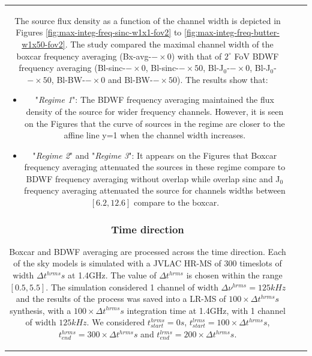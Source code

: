 \documentclass[useAMS,usenatbib]{mn2e}
\begin{document}
\begin{tabular}{*3{c}}
The source flux density as a function of the channel width is depicted in Figures \ref{fig:max-integ-freq-sinc-w1x1-fov2} to 
\ref{fig:max-integ-freq-butter-w1x50-fov2}. The study compared the maximal channel width of the boxcar frequency  averaging 
(Bx-avg-$-\times 0$) 
with that of  $2^{\circ}$ FoV BDWF frequency averaging (Bl-sinc-$-\times 0$, Bl-sinc-$-\times 50$, Bl-J$_0$-$-\times 0$, Bl-J$_0$-$-\times 
50$, Bl-BW-$-\times 0$ and Bl-BW-$-\times 50$). 
The results show that:
\begin{itemize}
 \item "\textit{Regime 1}":  The BDWF frequency averaging maintained the flux density of the source for wider frequency channels. However, 
it is seen on the Figures that the curve of sources in the regime are closer to the affine line y=1 when the channel width increases.
 \item  "\textit{Regime 2}" and "\textit{Regime 3}": It appears on the Figures that Boxcar frequency averaging attenuated the sources in 
these regime compare to BDWF frequency averaging without overlap while overlap sinc and J$_0$ frequency averaging attenuated the source for 
channels widths between $[6.2,12.6]$ compare to the boxcar. 
\end{itemize}
\subsubsection{Time direction}
Boxcar and BDWF averaging are processed across the time direction.
 Each of the sky models is simulated with a JVLAC HR-MS of $300$ timeslots of width $\Delta t^{hrms}s$ at 1.4GHz. The value of  
$\Delta t^{hrms}$ is chosen within the range $[0.5,5.5]$. The simulation considered  1 channel of width $\Delta \nu^{hrms}=125kHz$ and the 
results of the process was saved into a LR-MS of $100\times\Delta t^{hrms}s$ synthesis, with a $100\times\Delta t^{hrms}s$ 
integration time at 1.4GHz, with 
1 channel of width $125kHz$. We considered $t^{hrms}_{start}=0s$, $t^{lrms}_{start}=100\times\Delta t^{hrms} s$, 
$t^{hrms}_{end}=300\times\Delta t^{hrms}s$ and $t^{lrms}_{end}=200\times\Delta t^{hrms}s$.


\end{tabular}
\end{document}
